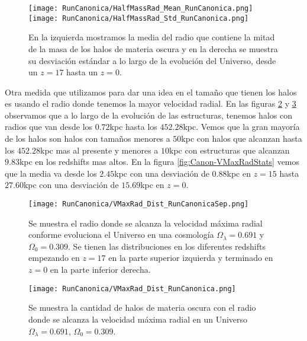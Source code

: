 \begin{figure}[H]
    \centering
    \texttt{[image: RunCanonica/HalfMassRad\_Mean\_RunCanonica.png]}
    \texttt{[image: RunCanonica/HalfMassRad\_Std\_RunCanonica.png]}
    \caption[Media y desviación estándar del radio de la mitad de la masa]{\footnotesize En la izquierda mostramos la media del radio que contiene la mitad de la masa de los halos de materia oscura y en la derecha se muestra su desviación estándar a lo largo de la evolución del Universo, desde un $z=17$ hasta un $z=0$.}
    \label{fig:Canon-HalfMassRadStats}
\end{figure}

Otra medida que utilizamos para dar una idea en el tamaño que tienen los halos es usando el radio donde tenemos la mayor velocidad radial. En las figuras \ref{fig:Canon-VMaxRadDistSep} y \ref{fig:Canon-VMaxRadDist} observamos que a lo largo de la evolución de las estructuras, tenemos halos con radios que van desde los $0.72$kpc hasta los $452.28$kpc. Vemos que la gran mayoría de los halos son halos con tamaños menores a $50$kpc con halos que alcanzan hasta los $452.28$kpc mas al presente y menores a $10$kpc con estructuras que alcanzan $9.83$kpc en los redshifts mas altos. En la figura \ref{fig:Canon-VMaxRadStats} vemos que la media va desde los $2.45$kpc con una desviación de $0.88$kpc en $z=15$ hasta $27.60$kpc con una desviación de $15.69$kpc en $z=0$.

\begin{figure}[H]
    \centering
    \texttt{[image: RunCanonica/VMaxRad\_Dist\_RunCanonicaSep.png]}
    \caption[Radio donde se alcanza la velocidad máxima radial]{\footnotesize Se muestra el radio donde se alcanza la velocidad máxima radial conforme evoluciona el Universo en una cosmología $\Omega_\lambda = 0.691 $ y $\Omega_0 = 0.309$. Se tienen las distribuciones en los diferentes redshifts empezando en $z=17$ en la parte superior izquierda y terminado en $z=0$ en la parte inferior derecha.}
    \label{fig:Canon-VMaxRadDistSep}
\end{figure}

\begin{figure}[H]
    \centering
    \texttt{[image: RunCanonica/VMaxRad\_Dist\_RunCanonica.png]}
    \caption[Distribución del radio donde se alcanza la velocidad máxima radial]{\footnotesize Se muestra la cantidad de halos de materia oscura con el radio donde se alcanza la velocidad máxima radial en un Universo $\Omega_\lambda = 0.691 $, $\Omega_0 = 0.309$.}
    \label{fig:Canon-VMaxRadDist}
\end{figure}

